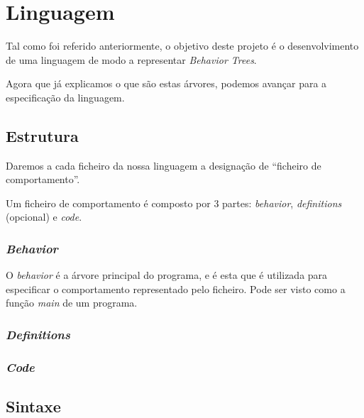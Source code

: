 
\chapter{Linguagem} %

\label{Chapter3} %

Tal como foi referido anteriormente, o objetivo deste projeto é o desenvolvimento de uma linguagem de modo a representar \textit{Behavior Trees}.

Agora que já explicamos o que são estas árvores, podemos avançar para a especificação da linguagem.

\section{Estrutura}
Daremos a cada ficheiro da nossa linguagem a designação de ``ficheiro de comportamento''.

Um ficheiro de comportamento é composto por 3 partes: \textit{behavior}, \textit{definitions} (opcional) e \textit{code}.

\subsection{\textit{Behavior}}
O \textit{behavior} é a árvore principal do programa, e é esta que é utilizada para especificar o comportamento representado pelo ficheiro.
Pode ser visto como a função \textit{main} de um programa.


\subsection{\textit{Definitions}}


\subsection{\textit{Code}}


\section{Sintaxe}


